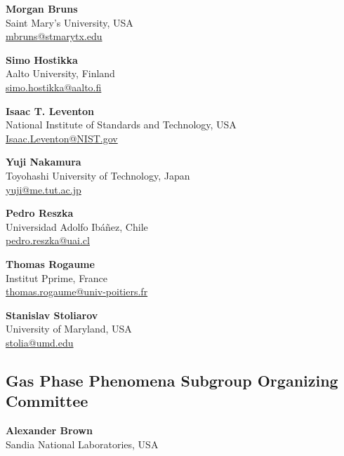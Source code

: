 \documentclass[12pt]{article}
\begin{document}
\textbf{Morgan Bruns} \\
Saint Mary's University, USA\\
\href{mailto:mbruns@stmarytx.edu}{mbruns@stmarytx.edu}
    \vspace{0.5cm}

\textbf{Simo Hostikka} \\
    Aalto University, Finland\\
    \href{mailto:simo.hostikka@aalto.fi}{simo.hostikka@aalto.fi}
   \vspace{0.5cm}

\textbf{Isaac T. Leventon}\\
     National Institute of Standards and Technology, USA\\
         \href{mailto:isaac.leventon@NIST.gov }{Isaac.Leventon@NIST.gov }
   \vspace{0.5cm}

\textbf{Yuji Nakamura} \\
    Toyohashi University of Technology, Japan\\
    \href{mailto:yuji@me.tut.ac.jp}{yuji@me.tut.ac.jp}
   \vspace{0.5cm}

\textbf{Pedro Reszka} \\
    Universidad Adolfo Ibáñez, Chile\\
    \href{mailto:pedro.reszka@uai.cl}{pedro.reszka@uai.cl}
   \vspace{0.5cm}

\textbf{Thomas Rogaume} \\
Institut Pprime, France\\
    \href{mailto:thomas.rogaume@univ-poitiers.fr}{thomas.rogaume@univ-poitiers.fr}

    \vspace{0.5cm}   

\textbf{Stanislav Stoliarov} \\
University of Maryland, USA\\
    \href{mailto:stolia@umd.edu}{stolia@umd.edu}
    \vspace{0.4cm}
    

\newpage
\subsection*{Gas Phase Phenomena Subgroup Organizing Committee}
\textbf{Alexander Brown} \\
Sandia National Laboratories, USA \\
\end{document}
